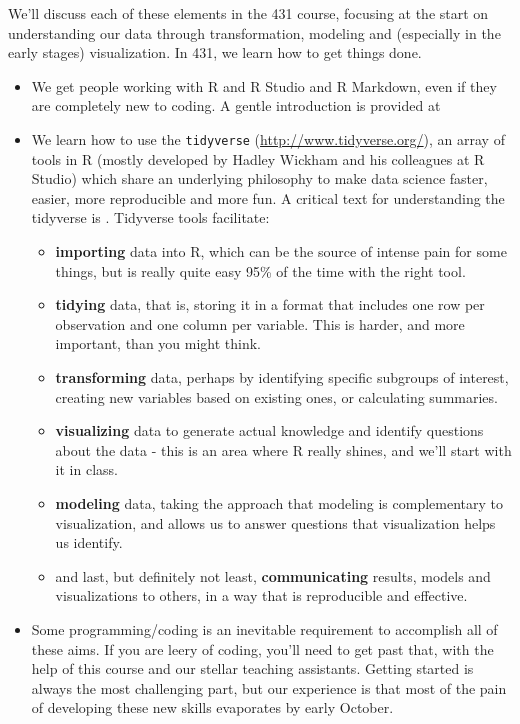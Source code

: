 \documentclass[
]{book}
\providecommand{\tightlist}{%
  \setlength{\itemsep}{0pt}\setlength{\parskip}{0pt}}
\begin{document}
We'll discuss each of these elements in the 431 course, focusing at the start on understanding our data through transformation, modeling and (especially in the early stages) visualization. In 431, we learn how to get things done.

\begin{itemize}
\tightlist
\item
  We get people working with R and R Studio and R Markdown, even if they are completely new to coding. A gentle introduction is provided at \citet{ModernDive}
\item
  We learn how to use the \texttt{tidyverse} (\url{http://www.tidyverse.org/}), an array of tools in R (mostly developed by Hadley Wickham and his colleagues at R Studio) which share an underlying philosophy to make data science faster, easier, more reproducible and more fun. A critical text for understanding the tidyverse is \citet{R4DS}. Tidyverse tools facilitate:

  \begin{itemize}
  \tightlist
  \item
    \textbf{importing} data into R, which can be the source of intense pain for some things, but is really quite easy 95\% of the time with the right tool.
  \item
    \textbf{tidying} data, that is, storing it in a format that includes one row per observation and one column per variable. This is harder, and more important, than you might think.
  \item
    \textbf{transforming} data, perhaps by identifying specific subgroups of interest, creating new variables based on existing ones, or calculating summaries.
  \item
    \textbf{visualizing} data to generate actual knowledge and identify questions about the data - this is an area where R really shines, and we'll start with it in class.
  \item
    \textbf{modeling} data, taking the approach that modeling is complementary to visualization, and allows us to answer questions that visualization helps us identify.
  \item
    and last, but definitely not least, \textbf{communicating} results, models and visualizations to others, in a way that is reproducible and effective.
  \end{itemize}
\item
  Some programming/coding is an inevitable requirement to accomplish all of these aims. If you are leery of coding, you'll need to get past that, with the help of this course and our stellar teaching assistants. Getting started is always the most challenging part, but our experience is that most of the pain of developing these new skills evaporates by early October.
\end{itemize}
\end{document}
